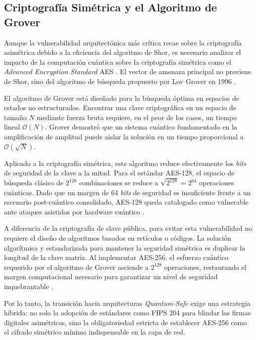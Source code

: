 \documentclass[11pt, a4paper]{report}
\theoremstyle{definition}
\begin{document}
\subsection{Criptografía Simétrica y el Algoritmo de Grover}

Aunque la vulnerabilidad arquitectónica más crítica recae sobre la criptografía asimétrica debido a la eficiencia del algoritmo de Shor, es necesario analizar el impacto de la computación cuántica sobre la criptografía simétrica como el \textit{Advanced Encryption Standard} AES \cite{nist2001aes}. El vector de amenaza principal no proviene de Shor, sino del algoritmo de búsqueda propuesto por Lov Grover en 1996 \cite{grover1996fast}.

El algoritmo de Grover está diseñado para la búsqueda óptima en espacios de estados no estructurados. Encontrar una clave criptográfica en un espacio de tamaño $N$ mediante fuerza bruta requiere, en el peor de los casos, un tiempo lineal $\mathcal{O}(N)$. Grover demostró que un sistema cuántico fundamentado en la amplificación de amplitud puede aislar la solución en un tiempo proporcional a $\mathcal{O}(\sqrt{N})$.

Aplicado a la criptografía simétrica, este algoritmo reduce efectivamente los \textit{bits} de seguridad de la clave a la mitad. Para el estándar AES-128, el espacio de búsqueda clásico de $2^{128}$ combinaciones se reduce a $\sqrt{2^{128}} = 2^{64}$ operaciones cuánticas. Dado que un margen de 64 \textit{bits} de seguridad es insuficiente frente a un escenario post-cuántico consolidado, AES-128 queda catalogado como vulnerable ante ataques asistidos por hardware cuántico \cite{nistir8105}.

A diferencia de la criptografía de clave pública, para evitar esta vulnerabilidad no requiere el diseño de algoritmos basados en retículos o códigos. La solución algorítmica y estandarizada para mantener la seguridad simétrica es duplicar la longitud de la clave matriz. Al implementar AES-256, el esfuerzo cuántico requerido por el algoritmo de Grover asciende a $2^{128}$ operaciones, restaurando el margen computacional necesario para garantizar un nivel de seguridad inquebrantable \cite{nistir8105}.

Por lo tanto, la transición hacia arquitecturas \textit{Quantum-Safe} exige una estrategia híbrida: no solo la adopción de estándares como FIPS 204 para blindar las firmas digitales asimétricas, sino la obligatoriedad estricta de establecer AES-256 como el cifrado simétrico mínimo indispensable en la capa de red.
\end{document}
